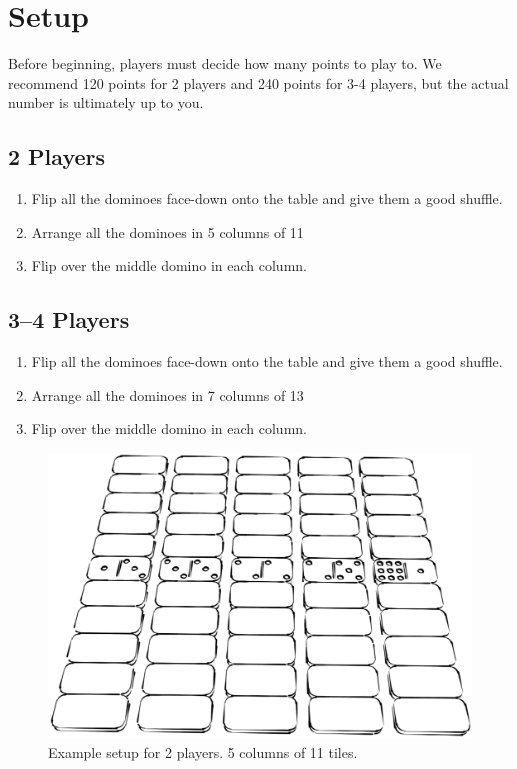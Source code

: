 \section{Setup}
Before beginning, players must decide how many points to play to. 
We recommend 120 points for 2 players and 240 points for 3-4 players, but the actual number is ultimately up to you.
\subsection{2 Players}

\begin{enumerate}
    \item Flip all the dominoes face-down onto the table and give them a good shuffle.
    \item Arrange all the dominoes in 5 columns of 11
    \item Flip over the middle domino in each column.
\end{enumerate}

\subsection{3--4 Players}

\begin{enumerate}
    \item Flip all the dominoes face-down onto the table and give them a good shuffle.
    \item Arrange all the dominoes in 7 columns of 13
    \item Flip over the middle domino in each column.
\end{enumerate}

\begin{figure}[ht]
\centering
\includegraphics[width = \linewidth]{dominoes-setup.png}
\caption{Example setup for 2 players. 5 columns of 11 tiles.}
\end{figure}
